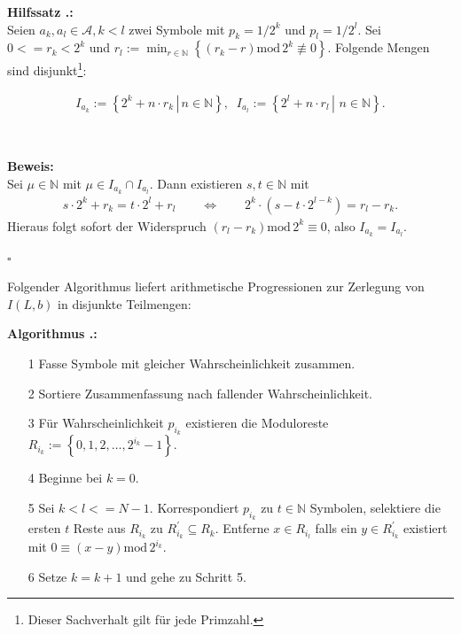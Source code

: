 \documentclass[a4paper,12pt]{article}
\newcommand{\N}{\mathbb N}
\newcommand{\A}{\mathcal A}
\newcounter{Hilfssatz}
\newcounter{Algorithmus}
\newenvironment{Hilfssatz}{
\medskip
        
        \setlength{\parindent}{0pt}
        \addtocounter{Hilfssatz}{1}
        \textbf{\textsf{Hilfssatz \thesubsection.\theHilfssatz}:}\\}{
        \nopagebreak
        \vspace{-1.0ex}
        \bigskip\\
}
\newenvironment{proof}{
        \setlength{\parindent}{0pt}
        \textbf{Beweis:}\\}{
        \nopagebreak
        \vspace{-1.0ex}
        \begin{flushright}
             $\square$
        \end{flushright}
        \bigskip
        
}
\newenvironment{Algorithmus}{
\medskip
        
        \setlength{\parindent}{0pt}
        \addtocounter{Algorithmus}{1}
        \textbf{\textsf{Algorithmus \thesubsection.\theAlgorithmus}:}}{
        \nopagebreak
        \vspace{-1.0ex}
        \bigskip
        
}
\begin{document}
\begin{Hilfssatz}
Seien $a_{k}, a_{l}\in \A, k < l$ zwei Symbole mit $p_k=1 / 2^{k}$ und $p_l=1 / 2^{l}$.
Sei $0<= r_k <2^k$ und $r_l:=\min_{r\in\N}
\left\{(r_k-r)\text{mod}\,2^k \not\equiv 0\right\}$.
Folgende Mengen sind disjunkt\footnote{\footnotesize{Dieser Sachverhalt gilt für jede Primzahl.}}:

\begin{align*}
I_{a_k}:=\left\{2^k + n\cdot r_k \,\left|\right.\, n\in\N\right\},\;\;
I_{a_l}:=\left\{2^l +  n\cdot r_l\,\left|\right.\,\,n\in\N \right\}.
\end{align*}
\end{Hilfssatz}

\begin{proof}
Sei $\mu\in\N$ mit $\mu\in I_{a_k}\cap I_{a_l}$. Dann existieren $s,t \in\N$ mit
\begin{align*}
 s\cdot 2^k + r_k =t \cdot 2^l +  r_l\qquad \Leftrightarrow\qquad 2^k\cdot \left(s - t\cdot 2^{l-k}\right) = r_l - r_k.
\end{align*}
Hieraus folgt sofort der Widerspruch $(r_l-r_k)\text{mod}\,2^k \equiv 0$, also $I_{a_{k}}= I_{a_{l}}$.
\end{proof}
Folgender Algorithmus liefert arithmetische Progressionen zur Zerlegung von $I(L,b)$ in disjunkte Teilmengen: 
\begin{Algorithmus}
\begin{itemize}
\item[1] Fasse Symbole mit gleicher Wahrscheinlichkeit zusammen.
\item[2] Sortiere Zusammenfassung nach fallender Wahrscheinlichkeit.
\item[3] Für Wahrscheinlichkeit $p_{i_{k}}$ existieren die Moduloreste	$R_{i_{k}}:=\left\{0, 1, 2, \ldots, 2^{i_{k}}-1\right\}$.
\item[4] Beginne bei $k=0$.
\item[5] Sei $k<l <=N-1$. Korrespondiert $p_{i_{k}}$ zu $t\in\N$ Symbolen, selektiere die ersten $t$ Reste aus $R_{i_{k}}$  zu $R_{i_{k}}^{'} \subseteq R_{k}$. Entferne $x \in R_{i_{l}}$ falls ein $y\in R_{i_{k}}^{'}$ existiert mit $0 \equiv (x-y)\text{mod}\,2^{i_{k}}.$
\item[6] Setze $k=k+1$ und gehe zu Schritt 5.
\end{itemize}
\end{Algorithmus}
\end{document}
